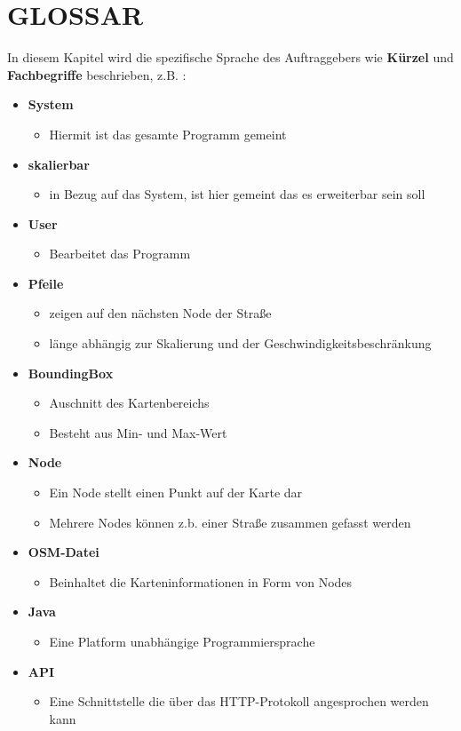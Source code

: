 	\section{\Large GLOSSAR}
	In diesem Kapitel wird die spezifische Sprache des Auftraggebers wie \textbf{ Kürzel } und \textbf{ Fachbegriffe } beschrieben, z.B. :
	\begin{itemize}
		\item \textbf{ System }
		\begin{itemize}
			\item Hiermit ist das gesamte Programm gemeint 
		\end{itemize}
		\item \textbf{ skalierbar}
		\begin{itemize}
			\item in Bezug auf das System, ist hier gemeint das es erweiterbar sein soll
		\end{itemize}
		\item \textbf{ User }
		\begin{itemize}
			\item Bearbeitet das Programm
		\end{itemize}
		\item \textbf{ Pfeile }
		\begin{itemize}
			\item zeigen auf den nächsten Node der Straße
			\item länge abhängig zur Skalierung und der Geschwindigkeitsbeschränkung
		\end{itemize}
		\item \textbf{ BoundingBox }
		\begin{itemize}
			\item Auschnitt des Kartenbereichs
			\item Besteht aus Min- und Max-Wert
		\end{itemize}
		\item \textbf{ Node }
		\begin{itemize}
			\item Ein Node stellt einen Punkt auf der Karte dar
			\item Mehrere Nodes können z.b. einer Straße zusammen gefasst werden
		\end{itemize}
		\item \textbf{ OSM-Datei }
		\begin{itemize}
			\item Beinhaltet die Karteninformationen in Form von Nodes 
		\end{itemize}
		\item \textbf{ Java }
		\begin{itemize}
			\item Eine Platform unabhängige Programmiersprache 
		\end{itemize}
		\item \textbf{ API }
		\begin{itemize}
			\item Eine Schnittstelle die über das HTTP-Protokoll angesprochen werden kann 
		\end{itemize}
	\end{itemize}

		